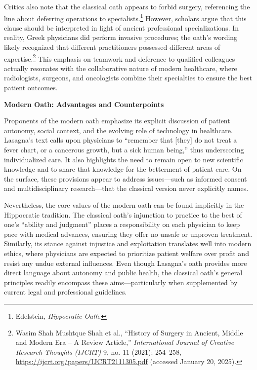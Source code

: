 \documentclass[12pt]{article}
\begin{document}
Critics also note that the classical oath appears to forbid surgery, referencing the line about deferring operations to specialists.\footnote{Edelstein, \textit{Hippocratic Oath}.} 
However, scholars argue that this clause should be interpreted in light of ancient professional specializations. 
In reality, Greek physicians did perform invasive procedures; 
the oath’s wording likely recognized that different practitioners possessed different areas of expertise.\footnote{Wasim Shah Mushtque Shah et al., 
``History of Surgery in Ancient, Middle and Modern Era -- A Review Article,'' 
\textit{International Journal of Creative Research Thoughts (IJCRT)} 9, no. 11 (2021): 254--258, 
\url{https://ijcrt.org/papers/IJCRT2111305.pdf} (accessed January 20, 2025).} 
This emphasis on teamwork and deference to qualified colleagues actually resonates with the collaborative nature of modern healthcare, 
where radiologists, surgeons, and oncologists combine their specialties to ensure the best patient outcomes.

\bigskip
\textbf{Modern Oath: Advantages and Counterpoints}

Proponents of the modern oath emphasize its explicit discussion of patient autonomy, social context, 
and the evolving role of technology in healthcare. 
Lasagna’s text calls upon physicians to “remember that [they] do not treat a fever chart, or a cancerous growth, but a sick human being,” 
thus underscoring individualized care. 
It also highlights the need to remain open to new scientific knowledge and to share that knowledge for the betterment of patient care. 
On the surface, these provisions appear to address issues—such as informed consent and multidisciplinary research—that the classical version never explicitly names.

Nevertheless, the core values of the modern oath can be found implicitly in the Hippocratic tradition. 
The classical oath’s injunction to practice to the best of one’s ``ability and judgment'' places a responsibility on each physician 
to keep pace with medical advances, ensuring they offer no unsafe or unproven treatment. 
Similarly, its stance against injustice and exploitation translates well into modern ethics, 
where physicians are expected to prioritize patient welfare over profit and resist any undue external influences. 
Even though Lasagna’s oath provides more direct language about autonomy and public health, 
the classical oath’s general principles readily encompass these aims—particularly when supplemented by current legal and professional guidelines.
\end{document}
